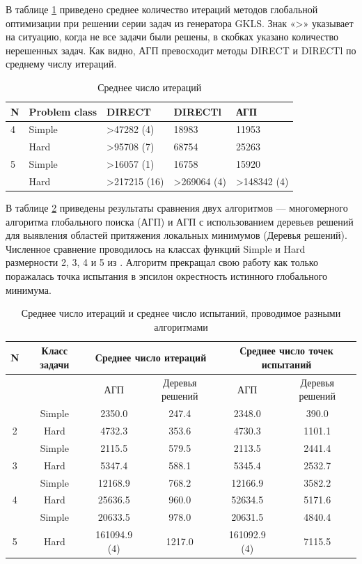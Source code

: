 \documentclass[12pt, a4paper, russian]{article}
\begin{document}
В таблице \ref{tab:1} приведено среднее количество итераций методов глобальной оптимизации при решении серии задач из генератора GKLS. Знак «>» указывает на ситуацию, когда не все задачи были решены, в скобках указано количество нерешенных задач. Как видно, АГП превосходит методы DIRECT и DIRECTl по среднему числу итераций. 


\begin{table}[!ht]
    \caption{Среднее число итераций}
    \label{tab:1}
    \centering
    \begin{tabular}{|l|l|l|l|l|}
    \hline
        N & Problem class & DIRECT & DIRECTl & АГП  \\ \hline
        4 & Simple & >47282 (4) & 18983 & 11953  \\ \hline
        ~ & Hard & >95708 (7) & 68754 & 25263  \\ \hline
        5 & Simple & >16057 (1) & 16758 & 15920  \\ \hline
        ~ & Hard & >217215 (16) & >269064 (4) & >148342 (4)  \\ \hline
    \end{tabular}
\end{table}

В таблице \ref{tab:2} приведены результаты сравнения двух алгоритмов –-- многомерного алгоритма глобального поиска (АГП) и АГП с использованием деревьев решений для выявления областей притяжения локальных минимумов (Деревья решений). Численное сравнение проводилось на классах функций Simple и Hard размерности 2, 3, 4 и 5 из \cite{fio_bib19}. Алгоритм прекращал свою работу как только поражалась точка испытания в эпсилон окрестность истинного глобального минимума. 

\begin{table}[h!]
    \caption{Среднее число итераций и среднее число испытаний, проводимое разными алгоритмами}
    \label{tab:2}
    \centering
    \begin{tabular}{|c|c|c|c|c|c|}
    \hline
	
        N & Класс задачи & \multicolumn{2}{c|}{Среднее число итераций} & \multicolumn{2}{c|}{Среднее число точек испытаний} \\ \hline
          & ~ & АГП & Деревья решений & АГП & Деревья решений \\ \hline
          & Simple & 2350.0 & 247.4 & 2348.0 & 390.0  \\ \hline
        2  & Hard & 4732.3 & 353.6 & 4730.3 & 1101.1  \\ \hline
          & Simple & 2115.5 & 579.5 & 2113.5 & 2441.4  \\ \hline
        3  & Hard & 5347.4 & 588.1 & 5345.4 & 2532.7  \\ \hline
          & Simple & 12168.9 & 768.2 & 12166.9 & 3582.2  \\ \hline
        4  & Hard & 25636.5 & 960.0 & 52634.5 & 5171.6  \\ \hline
          & Simple & 20633.5 & 978.0 & 20631.5 & 4840.4  \\ \hline
        5  & Hard & 161094.9 (4) & 1217.0 & 161092.9 (4) & 7115.5  \\ \hline
    \end{tabular}
\end{table}
\end{document}
